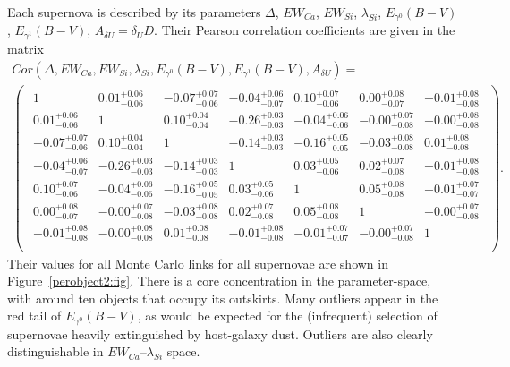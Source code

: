 \documentclass{aastex61}   	%
\begin{document}
Each supernova is described by its parameters
 $\Delta$, $EW_{Ca}$, $EW_{Si}$, $\lambda_{Si}$, $E_{\gamma^0}(B-V)$, $E_{\gamma^1}(B-V)$,  $A_{\delta U}=\delta_U D$.
 Their Pearson correlation coefficients are given in the matrix
\begin{multline}
Cor(\Delta, EW_{Ca}, EW_{Si}, \lambda_{Si}, E_{\gamma^0}(B-V), E_{\gamma^1}(B-V),  A_{\delta U}) =\\
\begin{pmatrix}
\begin{array}{rrrrrrr}
1 & 0.01^{+0.06}_{-0.06} & -0.07^{+0.07}_{-0.06} & -0.04^{+0.06}_{-0.07} & 0.10^{+0.07}_{-0.06} & 0.00^{+0.08}_{-0.07} & -0.01^{+0.08}_{-0.08} \\
0.01^{+0.06}_{-0.06} & 1 & 0.10^{+0.04}_{-0.04} & -0.26^{+0.03}_{-0.03} & -0.04^{+0.06}_{-0.06} & -0.00^{+0.07}_{-0.08} & -0.00^{+0.08}_{-0.08} \\
-0.07^{+0.07}_{-0.06} & 0.10^{+0.04}_{-0.04} & 1 & -0.14^{+0.03}_{-0.03} & -0.16^{+0.05}_{-0.05} & -0.03^{+0.08}_{-0.08} & 0.01^{+0.08}_{-0.08} \\
-0.04^{+0.06}_{-0.07} & -0.26^{+0.03}_{-0.03} & -0.14^{+0.03}_{-0.03} & 1 & 0.03^{+0.05}_{-0.06} & 0.02^{+0.07}_{-0.08} & -0.01^{+0.08}_{-0.08} \\
0.10^{+0.07}_{-0.06} & -0.04^{+0.06}_{-0.06} & -0.16^{+0.05}_{-0.05} & 0.03^{+0.05}_{-0.06} & 1 & 0.05^{+0.08}_{-0.08} & -0.01^{+0.07}_{-0.07} \\
0.00^{+0.08}_{-0.07} & -0.00^{+0.07}_{-0.08} & -0.03^{+0.08}_{-0.08} & 0.02^{+0.07}_{-0.08} & 0.05^{+0.08}_{-0.08} & 1 & -0.00^{+0.07}_{-0.08} \\
-0.01^{+0.08}_{-0.08} & -0.00^{+0.08}_{-0.08} & 0.01^{+0.08}_{-0.08} & -0.01^{+0.08}_{-0.08} & -0.01^{+0.07}_{-0.07} & -0.00^{+0.07}_{-0.08} & 1 \\
\end{array}
\end{pmatrix}.
\label{corr2p:eqn}
\end{multline}
Their values for all Monte Carlo links for all supernovae are shown in Figure~\ref{perobject2:fig}.
There is a core concentration in the  parameter-space, with around ten objects that occupy its outskirts.
Many outliers appear in the red tail of $E_{\gamma^0}(B-V)$, as would be expected for the (infrequent) selection of supernovae
heavily extinguished by host-galaxy dust.
Outliers  are also clearly distinguishable in  $EW_{Ca}$--$\lambda_{Si}$ space.   

\end{document}
